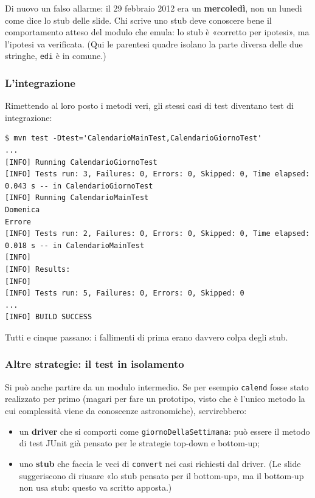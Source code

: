 Di nuovo un falso allarme: il 29 febbraio 2012 era un \textbf{mercoledì}, non un lunedì come dice lo stub delle slide.
Chi scrive uno stub deve conoscere bene il comportamento atteso del modulo che emula: lo stub è «corretto per ipotesi»,
ma l'ipotesi va verificata. (Qui le parentesi quadre isolano la parte diversa delle due stringhe, \texttt{edi} è in
comune.)

\subsubsection*{L'integrazione}

Rimettendo al loro posto i metodi veri, gli stessi casi di test diventano test di integrazione:

\begin{lstlisting}[style=shell, name=Terminale, deletestring={[b]'}]
$ mvn test -Dtest='CalendarioMainTest,CalendarioGiornoTest'
...
[INFO] Running CalendarioGiornoTest
[INFO] Tests run: 3, Failures: 0, Errors: 0, Skipped: 0, Time elapsed: 0.043 s -- in CalendarioGiornoTest
[INFO] Running CalendarioMainTest
Domenica
Errore
[INFO] Tests run: 2, Failures: 0, Errors: 0, Skipped: 0, Time elapsed: 0.018 s -- in CalendarioMainTest
[INFO]
[INFO] Results:
[INFO]
[INFO] Tests run: 5, Failures: 0, Errors: 0, Skipped: 0
...
[INFO] BUILD SUCCESS
\end{lstlisting}

Tutti e cinque passano: i fallimenti di prima erano davvero colpa degli stub.

\subsubsection*{Altre strategie: il test in isolamento}

Si può anche partire da un modulo intermedio. Se per esempio \texttt{calend} fosse stato realizzato per primo (magari
per fare un prototipo, visto che è l'unico metodo la cui complessità viene da conoscenze astronomiche), servirebbero:

\begin{itemize}
  \item un \textbf{driver} che si comporti come \texttt{giornoDellaSettimana}: può essere il metodo di test JUnit già
        pensato per le strategie top-down e bottom-up;
  \item uno \textbf{stub} che faccia le veci di \texttt{convert} nei casi richiesti dal driver. (Le slide suggeriscono
        di riusare «lo stub pensato per il bottom-up», ma il bottom-up non usa stub: questo va scritto apposta.)
\end{itemize}

